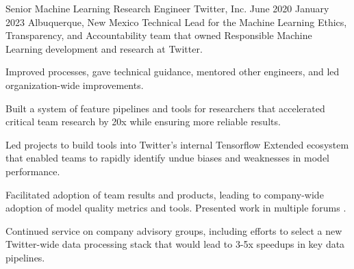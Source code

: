 \documentclass[print]{ag-cv} %
\begin{document}
\begin{job}
  {Senior Machine Learning Research Engineer}
  {Twitter, Inc.}
  {June 2020}
  {January 2023}
  {Albuquerque, New Mexico}
  {
    Technical Lead for the Machine Learning Ethics, Transparency, and Accountability team that owned
    Responsible Machine Learning development and research at Twitter.
  }
  {
    \begin{myitemize}
      \item Improved processes, gave technical guidance, mentored other engineers, and led organization-wide improvements.

      \item Built a system of feature pipelines and tools for researchers that accelerated critical team research by 20x while ensuring more reliable results.

      \item Led projects to build tools into Twitter's internal Tensorflow Extended ecosystem that enabled teams to rapidly identify undue biases and weaknesses in model performance.

      \item Facilitated adoption of team results and products, leading to company-wide adoption of model quality metrics and tools. Presented work in multiple forums \autocite{twitter_htl_racial_bias,twitter_recsys_distributional_inequality,facct_2022_talk,datascience_2022_talk,privacy_enchancing_tech_post}.

      \item Continued service on company advisory groups, including efforts to select a new Twitter-wide data processing stack that would lead to 3-5x speedups in key data pipelines.
    \end{myitemize}
  }
\end{job}
\end{document}
